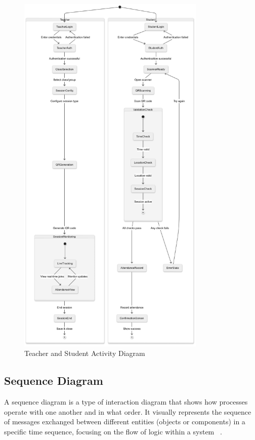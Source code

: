 \documentclass[12pt,a4paper]{report}
\begin{document}
\clearpage
\begin{figure}[htbp]
    \centering
    \includegraphics[width=0.8\textwidth]{images/morsli/Activity2.png}
    \caption{Teacher and Student Activity Diagram}
    \label{fig:attendance-system}
\end{figure}




\clearpage
\subsection{Sequence Diagram}

A sequence diagram is a type of interaction diagram that shows how processes operate with one another and in what order. It visually represents the sequence of messages exchanged between different entities (objects or components) in a specific time sequence, focusing on the flow of logic within a system~\cite{booch2005uml}
.
\end{document}
